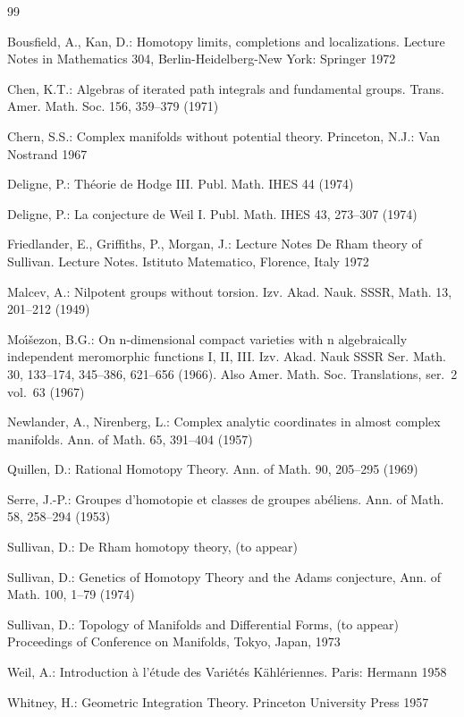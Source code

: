 \documentclass[11pt]{amsart}
\theoremstyle{plain}
\theoremstyle{definition}
\begin{document}
\begin{thebibliography}{99}

 Bousfield, A., Kan, D.: Homotopy limits, completions and localizations. Lecture Notes in Mathematics 304, Berlin-Heidelberg-New York: Springer 1972

 Chen, K.T.: Algebras of iterated path integrals and fundamental groups. Trans. Amer. Math. Soc. 156, 359--379 (1971)

 Chern, S.S.: Complex manifolds without potential theory. Princeton, N.J.: Van Nostrand 1967

 Deligne, P.: Th\'{e}orie de Hodge III. Publ. Math. IHES 44 (1974)

 Deligne, P.: La conjecture de Weil I. Publ. Math. IHES 43, 273--307 (1974)

 Friedlander, E., Griffiths, P., Morgan, J.: Lecture Notes De Rham theory of Sullivan. Lecture Notes. Istituto Matematico, Florence, Italy 1972

 Malcev, A.: Nilpotent groups without torsion. Izv. Akad. Nauk. SSSR, Math. 13, 201--212 (1949)

 Mo\'{\i}\v{s}ezon, B.G.: On n-dimensional compact varieties with n algebraically independent meromorphic functions I, II, III. Izv. Akad. Nauk SSSR Ser. Math. 30, 133--174, 345--386, 621--656 (1966). Also Amer. Math. Soc. Translations, ser.~2 vol.~63 (1967)

 Newlander, A., Nirenberg, L.: Complex analytic coordinates in almost complex manifolds. Ann. of Math. 65, 391--404 (1957)

 Quillen, D.: Rational Homotopy Theory. Ann. of Math. 90, 205--295 (1969)

 Serre, J.-P.: Groupes d'homotopie et classes de groupes ab\'{e}liens. Ann. of Math. 58, 258--294 (1953)

 Sullivan, D.: De Rham homotopy theory, (to appear)

 Sullivan, D.: Genetics of Homotopy Theory and the Adams conjecture, Ann. of Math. 100, 1--79 (1974)

 Sullivan, D.: Topology of Manifolds and Differential Forms, (to appear) Proceedings of Conference on Manifolds, Tokyo, Japan, 1973

 Weil, A.: Introduction \`{a} l'\'{e}tude des Vari\'{e}t\'{e}s K\"ahl\'{e}riennes. Paris: Hermann 1958

 Whitney, H.: Geometric Integration Theory. Princeton University Press 1957


\end{thebibliography}
\end{document}
